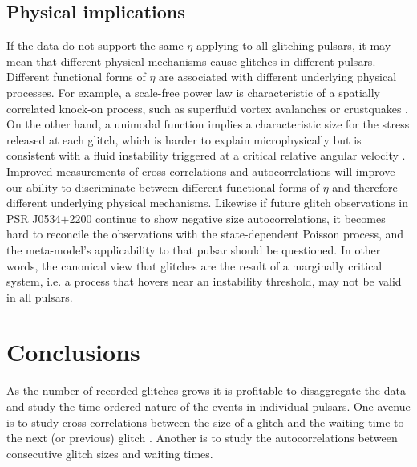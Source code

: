 \subsection{Physical implications}
If the data do not support the same $\eta$ applying to all glitching pulsars, it may mean that different physical mechanisms cause glitches in different pulsars. Different functional forms of $\eta$ are associated with different underlying physical processes. For example, a scale-free power law is characteristic of a spatially correlated knock-on process, such as superfluid vortex avalanches or crustquakes \citep{Middleditch2006, Warszawski2011}. On the other hand, a unimodal function implies a characteristic size for the stress released at each glitch, which is harder to explain microphysically but is consistent with a fluid instability triggered at a critical relative angular velocity \citep{Andersson2003, Mastrano2005, Melatos2007, Glampedakis2009}. Improved measurements of cross-correlations and autocorrelations will improve our ability to discriminate between different functional forms of $\eta$ and therefore different underlying physical mechanisms. Likewise if future glitch observations in PSR J0534$+$2200 continue to show negative size autocorrelations, it becomes hard to reconcile the observations with the state-dependent Poisson process, and the meta-model's applicability to that pulsar should be questioned. In other words, the canonical view that glitches are the result of a marginally critical system, i.e. a process that hovers near an instability threshold, may not be valid in all pulsars.

\section{Conclusions} \label{sec:acorr_concl}
As the number of recorded glitches grows it is profitable to disaggregate the data and study the time-ordered nature of the events in individual pulsars. One avenue is to study cross-correlations between the size of a glitch and the waiting time to the next (or previous) glitch \citep{Melatos2018}. Another is to study the autocorrelations between consecutive glitch sizes and waiting times. 

